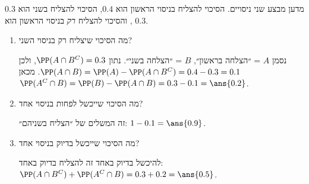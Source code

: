 מדען מבצע שני ניסויים. הסיכוי להצליח בניסוי הראשון הוא $0.4$, הסיכוי להצליח בשני הוא $0.3$, והסיכוי להצליח \emph{רק} בניסוי הראשון הוא $0.3$.
\begin{enumerate}
\item מה הסיכוי שיצליח רק בניסוי השני?
\begin{solbox}
נסמן $A$ = ״הצלחה בראשון״, $B$ = ״הצלחה בשני״. נתון $\PP(A\cap B^C)=0.3$, ולכן $\PP(A\cap B)=\PP(A)-\PP(A\cap B^C)=0.4-0.3=0.1$. מכאן $\PP(A^C\cap B)=\PP(B)-\PP(A\cap B)=0.3-0.1=\ans{0.2}$.
\end{solbox}
\item מה הסיכוי שייכשל לפחות בניסוי אחד?
\begin{solbox}
זה המשלים של ״הצליח בשניהם״: $1-0.1=\ans{0.9}$.
\end{solbox}
\item מה הסיכוי שייכשל בדיוק בניסוי אחד?
\begin{solbox}
להיכשל בדיוק באחד זה להצליח בדיוק באחד: $\PP(A\cap B^C)+\PP(A^C\cap B)=0.3+0.2=\ans{0.5}$.
\end{solbox}
\end{enumerate}

